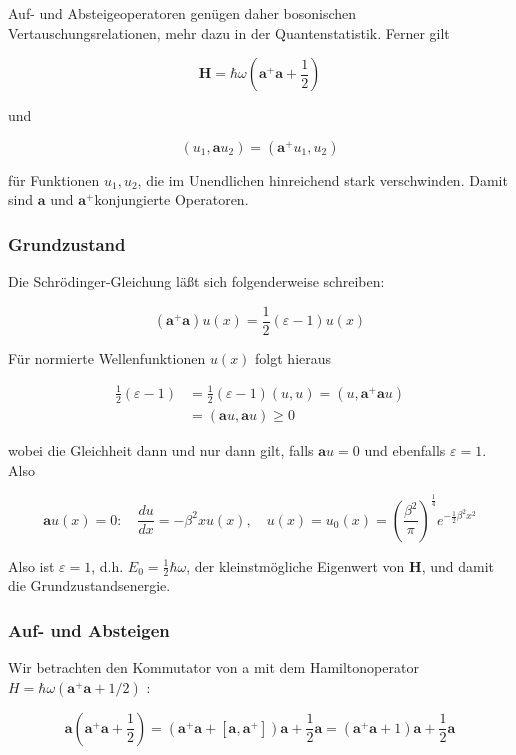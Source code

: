 \documentclass[10pt, letterpaper]{article}
\begin{document}
Auf- und Absteigeoperatoren genügen daher bosonischen Vertauschungsrelationen, mehr dazu in der Quantenstatistik. Ferner gilt

$$
\mathbf{H}=\hbar \omega\left(\mathbf{a}^{+} \mathbf{a}+\frac{1}{2}\right)
$$

und

$$
\left(u_{1}, \mathbf{a} u_{2}\right)=\left(\mathbf{a}^{+} u_{1}, u_{2}\right)
$$

für Funktionen $u_{1}, u_{2}$, die im Unendlichen hinreichend stark verschwinden. Damit sind $\mathbf{a}$ und $\mathbf{a}^{+}$konjungierte Operatoren.

\subsubsection*{Grundzustand}
Die Schrödinger-Gleichung läßt sich folgenderweise schreiben:

$$
\left(\mathbf{a}^{+} \mathbf{a}\right) u(x)=\frac{1}{2}(\varepsilon-1) u(x)
$$

Für normierte Wellenfunktionen $u(x)$ folgt hieraus

$$
\begin{aligned}
\frac{1}{2}(\varepsilon-1) & =\frac{1}{2}(\varepsilon-1)(u, u)=\left(u, \mathbf{a}^{+} \mathbf{a} u\right) \\
& =(\mathbf{a} u, \mathbf{a} u) \geq 0
\end{aligned}
$$

wobei die Gleichheit dann und nur dann gilt, falls $\mathbf{a} u=0$ und ebenfalls $\varepsilon=1$. Also

$$
\mathbf{a} u(x)=0: \quad \frac{d u}{d x}=-\beta^{2} x u(x), \quad u(x)=u_{0}(x)=\left(\frac{\beta^{2}}{\pi}\right)^{\frac{1}{4}} e^{-\frac{1}{2} \beta^{2} x^{2}}
$$

Also ist $\varepsilon=1$, d.h. $E_{0}=\frac{1}{2} \hbar \omega$, der kleinstmögliche Eigenwert von $\mathbf{H}$, und damit die Grundzustandsenergie.

\subsubsection*{Auf- und Absteigen}
Wir betrachten den Kommutator von a mit dem Hamiltonoperator $H=\hbar \omega\left(\mathbf{a}^{+} \mathbf{a}+1 / 2\right)$ :

$$
\mathbf{a}\left(\mathbf{a}^{+} \mathbf{a}+\frac{1}{2}\right)=\left(\mathbf{a}^{+} \mathbf{a}+\left[\mathbf{a}, \mathbf{a}^{+}\right]\right) \mathbf{a}+\frac{1}{2} \mathbf{a}=\left(\mathbf{a}^{+} \mathbf{a}+1\right) \mathbf{a}+\frac{1}{2} \mathbf{a}
$$
\end{document}
